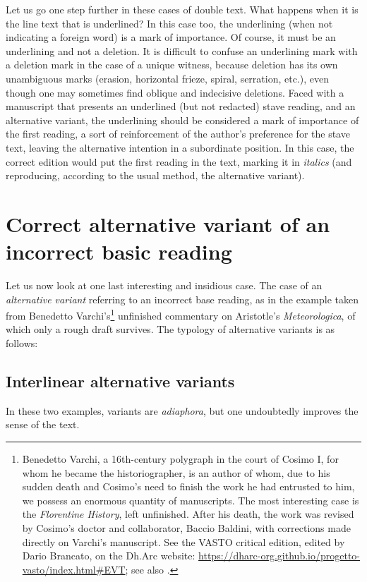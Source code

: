 \begin{paper}
Let us go one step further in these cases of double text. What happens
when it is the line text that is underlined? In this case too, the
underlining (when not indicating a foreign word) is a mark of
importance. Of course, it must be an underlining and not a deletion.
It is difficult to confuse an underlining mark with a deletion mark in
the case of a unique witness, because deletion has its own unambiguous
marks (erasion, horizontal frieze, spiral, serration, etc.), even though
one may sometimes find oblique and indecisive deletions. Faced with a
manuscript that presents an underlined (but not redacted) stave reading,
and an alternative variant, the underlining should be considered a mark
of importance of the first reading, a sort of reinforcement of the
author's preference for the stave text, leaving the alternative
intention in a subordinate position. In this case, the correct edition
would put the first reading in the text, marking it in \emph{italics}
(and reproducing, according to the usual method, the alternative
variant).

\section{Correct alternative variant of an incorrect basic reading}

Let us now look at one last interesting and insidious case. The case of
an \emph{alternative variant} referring to an incorrect base reading, as
in the example taken from Benedetto Varchi's\footnote{Benedetto Varchi,
  a 16th-century polygraph in the court of Cosimo I, for whom he became
  the historiographer, is an author of whom, due to his sudden death and
  Cosimo's need to finish the work he had entrusted to him, we possess
  an enormous quantity of manuscripts. The most interesting case is the
  \emph{Florentine History}, left unfinished. After his death, the work
  was revised by Cosimo's doctor and collaborator, Baccio Baldini, with
  corrections made directly on Varchi's manuscript. See the VASTO
  critical edition, edited by Dario Brancato, on the Dh.Arc website:
  \url{https://dharc-org.github.io/progetto-vasto/index.html\#EVT}; see
  also \cite{brancato_vasto_2021}.}
unfinished commentary on Aristotle's \emph{Meteorologica}, of which only
a rough draft survives. The typology of alternative variants is as
follows:

\subsection{Interlinear alternative variants}
In these two examples,
variants are \emph{adiaphora}, but one undoubtedly improves the sense of
the text.


\end{paper}
